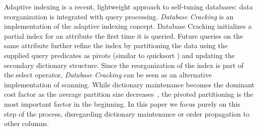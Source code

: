 Adaptive indexing \cite{ DBLP:conf/edbt/GraefeK10,
  DBLP:conf/cidr/IdreosKM07, DBLP:journals/pvldb/IdreosMKG11} is a
recent, lightweight approach to self-tuning databases: data
reorganization is integrated with query processing.  \emph{Database
  Cracking} \cite{DBLP:conf/cidr/IdreosKM07} is an implementation of
the adaptive indexing concept.  Database Cracking initializes a
partial index for an attribute the first time it is queried.  Future
queries on the same attribute further refine the index by partitioning
the data using the supplied query predicates as pivots (similar to
quicksort \cite{quicksort}) and updating the secondary dictionary
structure. Since the reorganization of the index is part of the select
operator, \emph{Database Cracking} can be seen as an alternative
implementation of scanning. While dictionary maintenance becomes the
dominant cost factor as the average partition size
decreases~\cite{CrackRepeat}, the pivoted partitioning is the most
important factor in the beginning. In this paper we focus purely on
this step of the process, disregarding dictionary maintenance or order
propagation to other columns.

